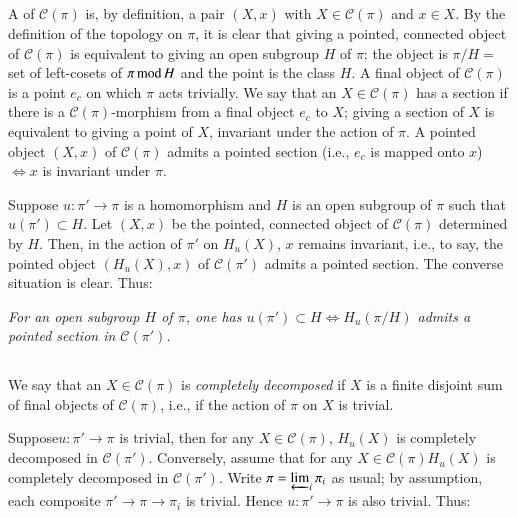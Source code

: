 \subsection{}\label{chap5-sec5.2.2}
A 
of $\mathscr{C}(\pi)$ is, by definition, a pair $(X,x)$ with
$X\in\mathscr{C}(\pi)$ and $x\in X$. By the definition of the topology
on $\pi$, it is clear that giving a pointed, connected object of
$\mathscr{C}(\pi)$ is equivalent to giving an open subgroup $H$ of
$\pi$; the object is $\pi/H=$ set of left-cosets of
$\pi\text{\,mod\,}H$ and the point is the class $H$. A final object of
$\mathscr{C}(\pi)$ is a point $e_{c}$ on which $\pi$ acts
trivially. We say that an $X\in\mathscr{C}(\pi)$ has a section if
there is a $\mathscr{C}(\pi)$-morphism from a final object $e_{c}$ to
$X$; giving a section of $X$ is equivalent to giving a point of $X$,
invariant under the action of $\pi$. A pointed object $(X,x)$ of
$\mathscr{C}(\pi)$ admits a pointed section (i.e., $e_{c}$ is mapped
onto $x$) $\Leftrightarrow x$ is invariant under $\pi$.

Suppose $u:\pi'\to \pi$ is a homomorphism and $H$ is an open subgroup
of $\pi$ such that $u(\pi')\subset H$. Let $(X,x)$ be the pointed,
connected object of $\mathscr{C}(\pi)$ determined by $H$. Then, in the
action of $\pi'$ on $H_{u}(X)$, $x$ remains invariant, i.e., to say,
the pointed object $(H_{u}(X),x)$ of $\mathscr{C}(\pi')$ admits a
pointed section. The converse situation is clear. Thus:

{\em For an open subgroup $H$ of $\pi$, one has $u(\pi')\subset
  H\Leftrightarrow H_{u}(\pi/H)$ admits a pointed section in
  $\mathscr{C}(\pi')$.} 

\subsection{}\label{chap5-sec5.2.3}
We say that an $X\in\mathscr{C}(\pi)$ is {\em completely decomposed}
if $X$ is a finite disjoint sum of final objects of
$\mathscr{C}(\pi)$, i.e., if the action of $\pi$ on $X$ is trivial.

Suppose\pageoriginale $u:\pi'\to \pi$ is trivial, then for any
$X\in\mathscr{C}(\pi)$, $H_{u}(X)$ is completely decomposed in
$\mathscr{C}(\pi')$. Conversely, assume that for any
$X\in\mathscr{C}(\pi)H_{u}(X)$ is completely decomposed in
$\mathscr{C}(\pi')$. Write $\pi=\varprojlim_{i}\pi_{i}$ as usual; by
assumption, each composite $\pi'\to \pi\to \pi_{i}$ is trivial. Hence
$u:\pi'\to \pi$ is also trivial. Thus:


